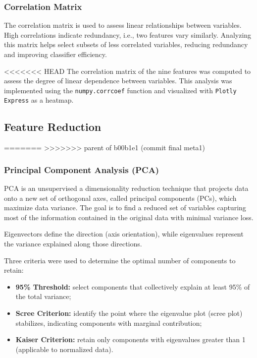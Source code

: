 \documentclass[a4paper,12pt]{article}
\begin{document}
\subsubsection{Correlation Matrix}

The correlation matrix is used to assess linear relationships between variables.  
High correlations indicate redundancy, i.e., two features vary similarly.  
Analyzing this matrix helps select subsets of less correlated variables, reducing redundancy and improving classifier efficiency.

<<<<<<< HEAD
The correlation matrix of the nine features was computed to assess the degree of linear dependence between variables.  
This analysis was implemented using the \texttt{numpy.corrcoef} function and visualized with \texttt{Plotly Express} as a heatmap.  


\subsection{Feature Reduction}

=======
>>>>>>> parent of b00b1e1 (commit final meta1)
\subsubsection{Principal Component Analysis (PCA)}

PCA is an unsupervised a dimensionality reduction technique that projects data onto a new set of orthogonal axes, called principal components (PCs), which maximize data variance.  
The goal is to find a reduced set of variables capturing most of the information contained in the original data with minimal variance loss.

Eigenvectors define the direction (axis orientation), while eigenvalues represent the variance explained along those directions.

Three criteria were used to determine the optimal number of components to retain:

\begin{itemize}
    \item \textbf{95\% Threshold:} select components that collectively explain at least 95\% of the total variance;
    \item \textbf{Scree Criterion:} identify the point where the eigenvalue plot (scree plot) stabilizes, indicating components with marginal contribution;
    \item \textbf{Kaiser Criterion:} retain only components with eigenvalues greater than 1 (applicable to normalized data).
\end{itemize}
\end{document}

